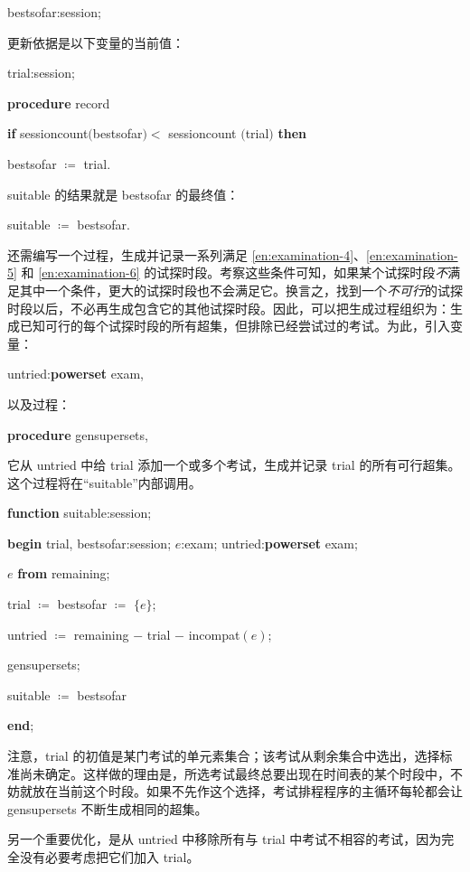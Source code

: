 \documentclass[twoside,11pt,fontset=none]{ctexbook}
\begin{document}
\quad bestsofar:session;

\noindent
更新依据是以下变量的当前值：

\quad trial:session;

\quad \textbf{procedure} record

\quad \quad \textbf{if} sessioncount$($bestsofar$) <$ sessioncount $($trial$)$ \textbf{then}

\quad \quad \quad bestsofar $\coloneq$ trial.

\noindent
suitable 的结果就是 bestsofar 的最终值：

\quad suitable $\coloneq$ bestsofar.

还需编写一个过程，生成并记录一系列满足 \ref{en:examination-4}、\ref{en:examination-5} 和 \ref{en:examination-6} 的试探时段。考察这些条件可知，如果某个试探时段\textit{不}满足其中一个条件，更大的试探时段也不会满足它。换言之，找到一个\textit{不可行}的试探时段以后，不必再生成包含它的其他试探时段。因此，可以把生成过程组织为：生成已知可行的每个试探时段的所有超集，但排除已经尝试过的考试。为此，引入变量：

\quad untried:\textbf{powerset} exam,

\noindent
以及过程：

\quad \textbf{procedure} gensupersets,

\noindent
它从 untried 中给 trial 添加一个或多个考试，生成并记录 trial 的所有可行超集。这个过程将在“suitable”内部调用。

\quad \textbf{function} suitable:session;

\quad \quad \textbf{begin} trial, bestsofar:session; $e$:exam; untried:\textbf{powerset} exam;

\quad \quad \quad $e$ \textbf{from} remaining;

\quad \quad \quad trial $\coloneq$ bestsofar $\coloneq$ $\{e\}$;

\quad \quad \quad untried $\coloneq$ remaining $-$ trial $-$ incompat$(e)$;

\quad \quad \quad gensupersets;

\quad \quad \quad suitable $\coloneq$ bestsofar

\quad \quad \textbf{end};

\noindent
注意，trial 的初值是某门考试的单元素集合；该考试从剩余集合中选出，选择标准尚未确定。这样做的理由是，所选考试最终总要出现在时间表的某个时段中，不妨就放在当前这个时段。如果不先作这个选择，考试排程程序的主循环每轮都会让 gensupersets 不断生成相同的超集。

另一个重要优化，是从 untried 中移除所有与 trial 中考试不相容的考试，因为完全没有必要考虑把它们加入 trial。
\end{document}
